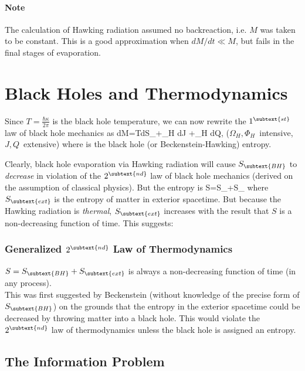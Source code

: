 \paragraph{Note} The calculation of Hawking radiation assumed no 
backreaction, i.e. $M$ was taken to be constant.  This is a good approximation
when $dM/dt\ll M$, but fails in the final stages of evaporation.\section{Black
Holes and Thermodynamics}

Since $T=\frac{\hbar\kappa}{2\pi}$ is the black hole temperature, 
we can now rewrite the $1^{\subtext{st}}$ law of black hole mechanics as
\be
dM=TdS_{}+\Omega_H dJ +\Phi_H dQ, \qquad \mbox{($\Omega_H,\Phi_H$ 
intensive, $J,Q$ extensive)}
\ee
where
is the black hole (or Beckenstein-Hawking) 
entropy.  

Clearly, black hole evaporation via Hawking radiation will 
cause $S_{\subtext{BH}}$ to \emph{decrease} in violation of the
$2^{\subtext{nd}}$ law of black hole mechanics (derived on the assumption of
classical physics).  But the entropy is 
\be
S=S_{}+S_{}
\ee
where $S_{\subtext{ext}}$ is the entropy of matter in exterior spacetime.  
But because the Hawking radiation is \emph{thermal}, $S_{\subtext{ext}}$
increases with the result that $S$ is a non-decreasing function of time.  This
suggests:

\subsubsection{Generalized $2^{\subtext{nd}}$ Law of Thermodynamics}

$S=S_{\subtext{BH}}+S_{\subtext{ext}}$ is always a non-decreasing function 
of time (in any process). \\

This was first suggested by Beckenstein (without knowledge of the precise 
form of $S_{\subtext{BH}}$) on the grounds that the entropy in the exterior
spacetime could be decreased by throwing matter into a black hole.  This would
violate the $2^{\subtext{nd}}$ law of thermodynamics unless the black hole is
assigned an entropy.

\subsection{The Information Problem}

